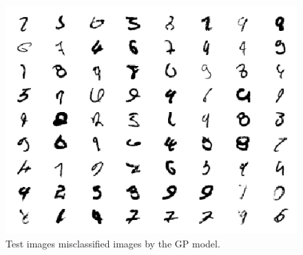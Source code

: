 \documentclass{article}
\begin{document}
\begin{figure}[h]
	\centering
	\includegraphics[scale=1.1]{incorrect_mnist}
	\caption{Test images misclassified images by the GP model.}
	\label{fig/incorrect_mnist}
\end{figure}
\end{document}
